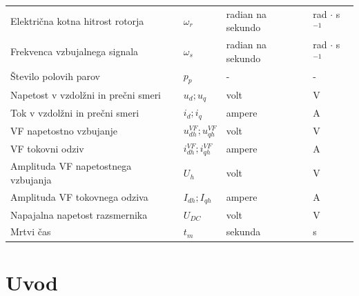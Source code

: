 \documentclass[a4paper,twoside,openright,12pt,slovene]{book}
\begin{document}
\begin{center}
\begin{tabular}{*{4}{l}}
        Električna kotna hitrost rotorja                           & $\omega_r$                             & radian na sekundo    & rad $\cdot$ s$^{-1}$     \\
        Frekvenca vzbujalnega signala                              & $\omega_{s}$                           & radian na sekundo    & rad $\cdot$ s$^{-1}$     \\
        Število polovih parov                                      & $p_p$                                  & -                    & -                      \\
        Napetost v vzdolžni in prečni smeri                        & $u_{d}; u_{q}$                         & volt                 & V                      \\
        Tok v vzdolžni in prečni smeri                             & $i_{d}; i_{q}$                         & ampere               & A                      \\
        VF napetostno vzbujanje                                    & $u^{VF}_{dh}; u^{VF}_{qh}$             & volt                 & V                      \\
        VF tokovni odziv                                           & $i^{VF}_{dh}; i^{VF}_{qh}$             & ampere               & A                      \\
        Amplituda VF napetostnega vzbujanja                        & $U_h$                                  & volt                 & V                      \\
        Amplituda VF tokovnega odziva                              & $I_{dh}; I_{qh}$                       & ampere               & A                      \\
        Napajalna napetost razsmernika                             & $U_{DC}$                               & volt                 & V                      \\
        Mrtvi čas                                                  & $t_m$                                  & sekunda              & s                      \\
    \end{tabular}
\end{center}

\mainmatter

\chapter{Uvod} \label{uvod}
\end{document}
